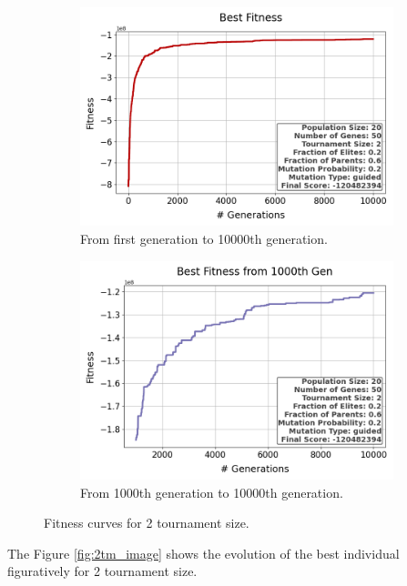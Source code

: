 \documentclass{assignment}
\begin{document}
\begin{figure}[h!]
    \begin{subfigure}{0.5\textwidth}
        \includegraphics[width=\textwidth]{figures/best_fitness_output_20_50_2_0.2_0.6_0.2_guided.png}
        \caption{From first generation to 10000th generation.}
    \end{subfigure}\hfill
    \begin{subfigure}{0.5\textwidth}
        \includegraphics[width=\textwidth]{figures/best_fitness_1000_output_20_50_2_0.2_0.6_0.2_guided.png}
        \caption{From 1000th generation to 10000th generation.}
    \end{subfigure}
    \caption{Fitness curves for 2 tournament size.}
\label{fig:2tm}
\end{figure}

The Figure \ref{fig:2tm_image} shows the evolution of the best individual figuratively for 2 tournament size.
\end{document}
